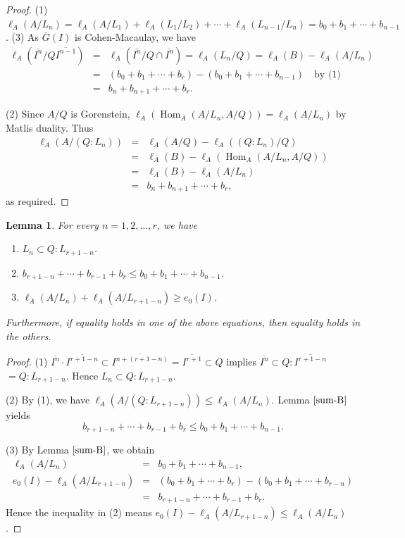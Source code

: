 \documentclass[12pt]{amsart}
\newtheorem{lem}[thm]{Lemma}
\theoremstyle{definition}
\theoremstyle{remark}
\numberwithin{equation}{section}
\DeclareMathOperator{\Hom}{Hom}
\renewcommand{\:}{\colon}
\begin{document}
\begin{proof}
(1) $\ell_A(A/L_n)=\ell_A(A/L_1)+\ell_A(L_1/L_2)+\cdots +\ell_A(L_{n-1}/L_n)=b_0+b_1+\cdots+b_{n-1}$. 
\vspace{3mm}
(3) As $\overline{G}(I)$ is Cohen-Macaulay, we have 
\begin{eqnarray*}
\ell_A(\overline{I^n}/Q\overline{I^{n-1}}) 
& = & \ell_A(\overline{I^n}/Q \cap \overline{I^{n}}) 
 = \ell_A(L_n/Q) 
 =  \ell_A(B)-\ell_A(A/L_n) \\
& = & (b_0+b_1+\cdots+b_r)-(b_0+b_1+\cdots+b_{n-1}) \quad \text{by (1)}\\
& = & b_n+b_{n+1}+\cdots + b_r. 
\end{eqnarray*}
\par 
(2) Since $A/Q$ is Gorenstein, 
$\ell_A(\Hom_A(A/L_n, A/Q))=\ell_A(A/L_n)$ by Matlis duality. 
Thus 
\begin{eqnarray*}
\ell_A(A/(Q:L_n))
&=&\ell_A(A/Q)-\ell_A((Q:L_n)/Q) \\ 
&=&\ell_A(B)-\ell_A(\Hom_A(A/L_n, A/Q)) \\
&=&\ell_A(B)-\ell_A(A/L_n) \\
&=& b_n+b_{n+1}+\cdots +b_r, 
\end{eqnarray*}
as required.  
\end{proof}

\begin{lem} \label{L-Ineq}
For every $n=1,2,\ldots,r$, we have 
\begin{enumerate}
\item $L_n \subset Q: L_{r+1-n}$. 
\item $b_{r+1-n}+\cdots+b_{r-1}+b_r \le b_0+b_1+\cdots +b_{n-1}$. 
\item $\ell_A(A/L_n)+\ell_A(A/L_{r+1-n}) \ge e_0(I)$. 
\end{enumerate}
Furthermore, if equality holds in one of the above equations, then 
equality holds in the others. 
\end{lem}
\begin{proof}
(1) $\overline{I^n}\cdot \overline{I^{r+1-n}} \subset 
\overline{I^{n+(r+1-n)}}=\overline{I^{r+1}}\subset Q$ implies  
$\overline{I^n} \subset Q: \overline{I^{r+1-n}}$
$ =Q : L_{r+1-n}$. 
Hence $L_n \subset Q:L_{r+1-n}$.
\par \vspace{2mm} \par \noindent
(2) By (1), we have $\ell_A(A/(Q:L_{r+1-n})) \le \ell_A(A/L_n)$. 
Lemma $\ref{sum-B}$ yields 
\[
b_{r+1-n} + \cdots + b_{r-1}+b_r \le b_0+b_1+\cdots+b_{n-1}. 
\]
\par \vspace{2mm} \par \noindent 
(3) By Lemma $\ref{sum-B}$, we obtain 
\begin{eqnarray*}
\ell_A(A/L_n) &=& b_0+b_1+\cdots +b_{n-1}, \\
e_0(I)-\ell_A(A/L_{r+1-n})
&=& (b_0+b_1+\cdots+b_r)-(b_0+b_1+\cdots+b_{r-n}) \\
&=& b_{r+1-n}+\cdots+b_{r-1}+b_r. 
\end{eqnarray*}
Hence the inequality in (2) means 
$e_0(I)-\ell_A(A/L_{r+1-n}) \le \ell_A(A/L_n)$.
\end{proof}
\end{document}
